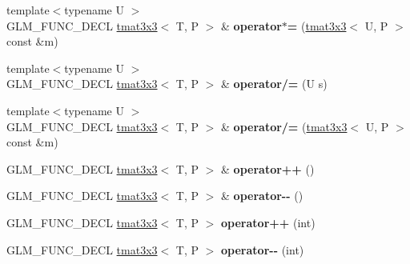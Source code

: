 \begin{DoxyCompactItemize}
\item 
\hypertarget{structglm_1_1tmat3x3_a47400ed8c5e80c7a0c44d1ca79acc556}{{\footnotesize template$<$typename U $>$ }\\G\-L\-M\-\_\-\-F\-U\-N\-C\-\_\-\-D\-E\-C\-L \hyperlink{structglm_1_1tmat3x3}{tmat3x3}$<$ T, P $>$ \& {\bfseries operator$\ast$=} (\hyperlink{structglm_1_1tmat3x3}{tmat3x3}$<$ U, P $>$ const \&m)}\label{structglm_1_1tmat3x3_a47400ed8c5e80c7a0c44d1ca79acc556}

\item 
\hypertarget{structglm_1_1tmat3x3_ad05055d1d22efff71a9f4b98f6f649fd}{{\footnotesize template$<$typename U $>$ }\\G\-L\-M\-\_\-\-F\-U\-N\-C\-\_\-\-D\-E\-C\-L \hyperlink{structglm_1_1tmat3x3}{tmat3x3}$<$ T, P $>$ \& {\bfseries operator/=} (U s)}\label{structglm_1_1tmat3x3_ad05055d1d22efff71a9f4b98f6f649fd}

\item 
\hypertarget{structglm_1_1tmat3x3_a890dc9c4a08a6439357222ae650a0222}{{\footnotesize template$<$typename U $>$ }\\G\-L\-M\-\_\-\-F\-U\-N\-C\-\_\-\-D\-E\-C\-L \hyperlink{structglm_1_1tmat3x3}{tmat3x3}$<$ T, P $>$ \& {\bfseries operator/=} (\hyperlink{structglm_1_1tmat3x3}{tmat3x3}$<$ U, P $>$ const \&m)}\label{structglm_1_1tmat3x3_a890dc9c4a08a6439357222ae650a0222}

\item 
\hypertarget{structglm_1_1tmat3x3_a84c942286d054a81fc140dd18d6db2b3}{G\-L\-M\-\_\-\-F\-U\-N\-C\-\_\-\-D\-E\-C\-L \hyperlink{structglm_1_1tmat3x3}{tmat3x3}$<$ T, P $>$ \& {\bfseries operator++} ()}\label{structglm_1_1tmat3x3_a84c942286d054a81fc140dd18d6db2b3}

\item 
\hypertarget{structglm_1_1tmat3x3_a7013a2e73ec5120df2863e0b7561a259}{G\-L\-M\-\_\-\-F\-U\-N\-C\-\_\-\-D\-E\-C\-L \hyperlink{structglm_1_1tmat3x3}{tmat3x3}$<$ T, P $>$ \& {\bfseries operator-\/-\/} ()}\label{structglm_1_1tmat3x3_a7013a2e73ec5120df2863e0b7561a259}

\item 
\hypertarget{structglm_1_1tmat3x3_ad220be8a855a7f252cc1173aa0c9e139}{G\-L\-M\-\_\-\-F\-U\-N\-C\-\_\-\-D\-E\-C\-L \hyperlink{structglm_1_1tmat3x3}{tmat3x3}$<$ T, P $>$ {\bfseries operator++} (int)}\label{structglm_1_1tmat3x3_ad220be8a855a7f252cc1173aa0c9e139}

\item 
\hypertarget{structglm_1_1tmat3x3_ad93f7aee9966646291e9b8c430cf4e9f}{G\-L\-M\-\_\-\-F\-U\-N\-C\-\_\-\-D\-E\-C\-L \hyperlink{structglm_1_1tmat3x3}{tmat3x3}$<$ T, P $>$ {\bfseries operator-\/-\/} (int)}\label{structglm_1_1tmat3x3_ad93f7aee9966646291e9b8c430cf4e9f}

\end{DoxyCompactItemize}
